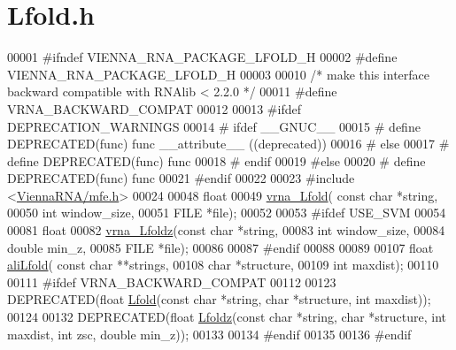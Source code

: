\hypertarget{Lfold_8h_source}{}\section{Lfold.\+h}
\label{Lfold_8h_source}

\begin{DoxyCode}
00001 \textcolor{preprocessor}{#ifndef VIENNA\_RNA\_PACKAGE\_LFOLD\_H}
00002 \textcolor{preprocessor}{#define VIENNA\_RNA\_PACKAGE\_LFOLD\_H}
00003 
00010 \textcolor{comment}{/* make this interface backward compatible with RNAlib < 2.2.0 */}
00011 \textcolor{preprocessor}{#define VRNA\_BACKWARD\_COMPAT}
00012 
00013 \textcolor{preprocessor}{#ifdef DEPRECATION\_WARNINGS}
00014 \textcolor{preprocessor}{# ifdef \_\_GNUC\_\_}
00015 \textcolor{preprocessor}{#  define DEPRECATED(func) func \_\_attribute\_\_ ((deprecated))}
00016 \textcolor{preprocessor}{# else}
00017 \textcolor{preprocessor}{#  define DEPRECATED(func) func}
00018 \textcolor{preprocessor}{# endif}
00019 \textcolor{preprocessor}{#else}
00020 \textcolor{preprocessor}{# define DEPRECATED(func) func}
00021 \textcolor{preprocessor}{#endif}
00022 
00023 \textcolor{preprocessor}{#include <\mbox{\hyperlink{mfe_8h}{ViennaRNA/mfe.h}}>}
00024 
00048 \textcolor{keywordtype}{float}
00049 \mbox{\hyperlink{group__local__mfe__fold_ga4918cce52bf69c1913cda503b2ac75d8}{vrna\_Lfold}}( \textcolor{keyword}{const} \textcolor{keywordtype}{char} *\textcolor{keywordtype}{string},
00050             \textcolor{keywordtype}{int} window\_size,
00051             FILE  *file);
00052 
00053 \textcolor{preprocessor}{#ifdef USE\_SVM}
00054 
00081 \textcolor{keywordtype}{float}
00082 \mbox{\hyperlink{group__local__mfe__fold_ga27fddda5fc63eb49c861e38845fc34b4}{vrna\_Lfoldz}}(\textcolor{keyword}{const} \textcolor{keywordtype}{char} *\textcolor{keywordtype}{string},
00083             \textcolor{keywordtype}{int} window\_size,
00084             \textcolor{keywordtype}{double} min\_z,
00085             FILE *file);
00086 
00087 \textcolor{preprocessor}{#endif}
00088 
00089 
00107 \textcolor{keywordtype}{float} \mbox{\hyperlink{group__local__consensus__fold_ga20a173a3cdb83f5d1778e36c1a6b1f2b}{aliLfold}}( \textcolor{keyword}{const} \textcolor{keywordtype}{char} **strings,
00108                 \textcolor{keywordtype}{char} *structure,
00109                 \textcolor{keywordtype}{int} maxdist);
00110 
00111 \textcolor{preprocessor}{#ifdef  VRNA\_BACKWARD\_COMPAT}
00112 
00123 DEPRECATED(\textcolor{keywordtype}{float} \mbox{\hyperlink{group__local__mfe__fold_ga16e5a70e60835bb969eaecbe6482f1be}{Lfold}}(\textcolor{keyword}{const} \textcolor{keywordtype}{char} *\textcolor{keywordtype}{string}, \textcolor{keywordtype}{char} *structure, \textcolor{keywordtype}{int} maxdist));
00124 
00132 DEPRECATED(\textcolor{keywordtype}{float} \mbox{\hyperlink{group__local__mfe__fold_gab6d79eecc180f586679f7b85cce5cbe9}{Lfoldz}}(\textcolor{keyword}{const} \textcolor{keywordtype}{char} *\textcolor{keywordtype}{string}, \textcolor{keywordtype}{char} *structure, \textcolor{keywordtype}{int} maxdist, \textcolor{keywordtype}{int} zsc, \textcolor{keywordtype}{double} min\_z));
00133 
00134 \textcolor{preprocessor}{#endif}
00135 
00136 \textcolor{preprocessor}{#endif}
\end{DoxyCode}
